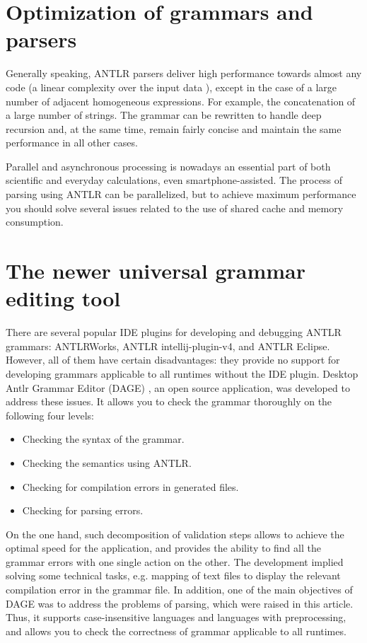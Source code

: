 \documentclass[a4paper, 10pt, conference]{ieeeconf}
\begin{document}
\section{Optimization of grammars and parsers}

Generally speaking, ANTLR parsers deliver high performance towards almost any code (a linear complexity over the input data \cite{ALL}), except in the case of a large number of adjacent homogeneous expressions. For example, the concatenation of a large number of strings. The grammar can be rewritten to handle deep recursion and, at the same time, remain fairly concise and maintain the same performance in all other cases.

Parallel and asynchronous processing is nowadays an essential part of both scientific and everyday calculations, even smartphone-assisted. The process of parsing using ANTLR can be parallelized, but to achieve maximum performance you should solve several issues related to the use of shared cache and memory consumption.

\section{The newer universal grammar editing tool}

There are several popular IDE plugins for developing and debugging ANTLR grammars: ANTLRWorks, ANTLR intellij-plugin-v4, and ANTLR Eclipse. However, all of them have certain disadvantages: they provide no support for developing grammars applicable to all runtimes without the IDE plugin. Desktop Antlr Grammar Editor (DAGE) \cite{DAGE}, an open source application, was developed to address these issues. It allows you to check the grammar thoroughly on the following four levels:

\begin{itemize}
\item Checking the syntax of the grammar.
\item Checking the semantics using ANTLR.
\item Checking for compilation errors in generated files.
\item Checking for parsing errors.
\end{itemize}

On the one hand, such decomposition of validation steps allows to achieve the optimal speed for the application, and provides the ability to find all the grammar errors with one single action on the other. The development implied solving some technical tasks, e.g. mapping of text files to display the relevant compilation error in the grammar file. In addition, one of the main objectives of DAGE was to address the problems of parsing, which were raised in this article. Thus, it supports case-insensitive languages and languages with preprocessing, and allows you to check the correctness of grammar applicable to all runtimes.
\end{document}
